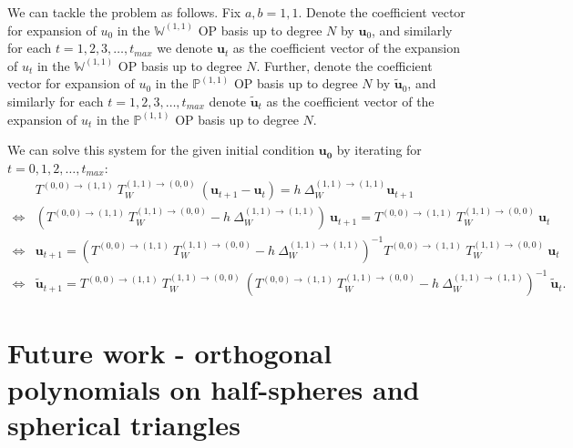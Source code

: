 \documentclass[11pt, oneside]{article}   	%
\newcommand{\Wii}{W^{(1,1)}}
\newcommand{\bigPii}{{\mathbb{P}^{(1,1)}}}
\newcommand{\laplacewii}{\Delta_W^{(1,1)\to(1,1)}}
\newcommand{\bigWii}{{\mathbb{W}^{(1,1)}}}
\begin{document}
We can tackle the problem as follows. Fix \(a, b = 1,1\). Denote the coefficient vector for expansion of $u_0$ in the $\bigWii$ OP basis up to degree $N$ by $\mathbf{u}_0$, and similarly for each $t = 1,2,3,\dots,t_{max}$ we denote $\mathbf{u}_t$ as the coefficient vector of the expansion of $u_t$ in the $\bigWii$ OP basis up to degree $N$. Further, denote the coefficient vector for expansion of $u_0$ in the $\bigPii$ OP basis up to degree $N$ by $\mathbf{\tilde{u}}_0$, and similarly for each $t = 1,2,3,\dots,t_{max}$ denote $\mathbf{\tilde{u}}_t$ as the coefficient vector of the expansion of $u_t$ in the $\bigPii$ OP basis up to degree $N$.

We can solve this system for the given initial condition $\mathbf{u_0}$ by iterating for $t = 0,1,2,\dots,t_{max}$:
\begin{align}
	&T^{(0,0)\to(1,1)} \: T_W^{(1,1)\to(0,0)} \: (\mathbf{u}_{t+1} - \mathbf{u}_t) = h \: \laplacewii \mathbf{u}_{t+1} \nonumber \\
	\iff& (T^{(0,0)\to(1,1)} \:T_W^{(1,1)\to(0,0)} - h \: \laplacewii) \: \mathbf{u}_{t+1} = T^{(0,0)\to(1,1)} \: T_W^{(1,1)\to(0,0)} \: \mathbf{u}_t \nonumber \\
	\iff& \mathbf{u}_{t+1} = (T^{(0,0)\to(1,1)} \: T_W^{(1,1)\to(0,0)} - h \: \laplacewii)^{-1} T^{(0,0)\to(1,1)} \: T_W^{(1,1)\to(0,0)} \: \mathbf{u}_t \nonumber \\
	\iff& \mathbf{\tilde{u}}_{t+1} = T^{(0,0)\to(1,1)} \: T_W^{(1,1)\to(0,0)} \: (T^{(0,0)\to(1,1)} \: T_W^{(1,1)\to(0,0)} - h \: \laplacewii)^{-1} \: \mathbf{\tilde{u}}_t.
\end{align}




%
\section{Future work - orthogonal polynomials on half-spheres and spherical triangles}
\end{document}
